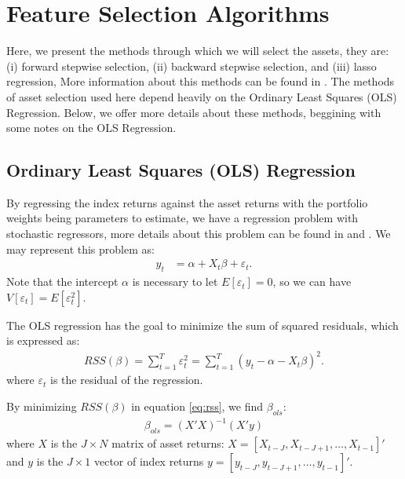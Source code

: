 \documentclass[preprint, doubleblind, authoryear,10pt]{elsarticle}
\begin{document}
\section{Feature Selection Algorithms} \label{sec:selection}

Here, we present the methods through which we will select the assets, they are:
(i) forward stepwise selection, 
(ii) backward stepwise selection, 
and
(iii) lasso regression,
More information about this methods can be found in \cite{isl-2014}.
The methods of asset selection used here depend heavily on the Ordinary Least Squares (OLS) Regression.
Below, we offer more details about these methods, beggining with some notes on the OLS Regression.

\subsection{Ordinary Least Squares (OLS) Regression}

By regressing the index returns against the asset returns with the portfolio weights being parameters to estimate, we have a regression problem with stochastic regressors, more details about this problem can be found in \cite{rao-2008} and \cite{rencher-2007}.
We may represent this problem as:
\begin{align*} 
	y_{t} &= \alpha + X_{t}\beta + \varepsilon_{t}.
\end{align*}
Note that the intercept $\alpha$ is necessary to let $E[\varepsilon_{t}]=0$, so we can have $V[\varepsilon_{t}] = E[\varepsilon_{t}^2]$.

The OLS regression has the goal to minimize the sum of squared residuals, which is expressed as:
\begin{align} \label{eq:rss}
	RSS(\beta)
	= \sum_{t=1}^{T} \varepsilon_t^2
	= \sum_{t=1}^{T} (y_t - \alpha - X_t \beta)^2.
\end{align}
where $\varepsilon_{t}$ is the residual of the regression.

By minimizing $RSS(\beta)$ in equation \eqref{eq:rss}, we find $\beta_{ols}$:
\begin{align} 
	\label{eq:bols}
	\beta_{ols} = (X'X)^{-1}(X'y)
\end{align}
where $X$ is the $J \times N$ matrix of asset returns: $X = [X_{t-J}, X_{t-J+1}, \dots , X_{t-1}]'$ and $y$ is the $J\times 1$ vector of index returns $y = [y_{t-J}, y_{t-J+1}, \dots , y_{t-1}]'$.
\end{document}
